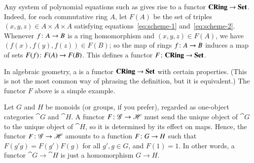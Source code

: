 \begin{example}
Any system of polynomial%
%
%
%
equations such as
% 
% 
gives rise to a functor $\mathbf{CRing} \to \mathbf{Set}$.  Indeed, for each commutative
ring $A$, let $F(A)$ be the set of triples $(x, y, z) \in A \times A \times
A$ satisfying equations~\eqref{eq:scheme-1} and~\eqref{eq:scheme-2}.
Whenever $f\from A \to B$ is a ring homomorphism and $(x, y, z) \in F(A)$,
we have $(f(x), f(y), f(z)) \in F(B)$; so the map of rings $f\from A \to B$
induces a map of sets $F(f) \from F(A) \to F(B)$.  This defines a functor
$F\from \CRing \to \Set$.

In algebraic%
%
%
geometry, a %
%
%
is a functor $\mathbf{CRing} \to \mathbf{Set}$ with certain properties.  (This is not the
most common way of phrasing the definition, but it is equivalent.)  The
functor $F$ above is a simple example.
\end{example}

\begin{example}
\label{eg:ftrs-between-monoids}
Let $G$ and $H$ be monoids (or groups, if you prefer), regarded as
one-object%
%
%
categories $\cat{G}$ and $\cat{H}$.  A functor $F\from \cat{G} \to \cat{H}$
must send the unique object of $\cat{G}$ to the unique object of $\cat{H}$,
so it is determined by its effect on maps.  Hence, the functor $F \from
\cat{G} \to \cat{H}$ amounts to a function $F\from G \to H$ such that $F(g'
g) = F(g') F(g)$ for all $g', g \in G$, and $F(1) = 1$.  In other words, a
functor $\cat{G} \to \cat{H}$ is just a homomorphism $G \to H$.
\end{example}

